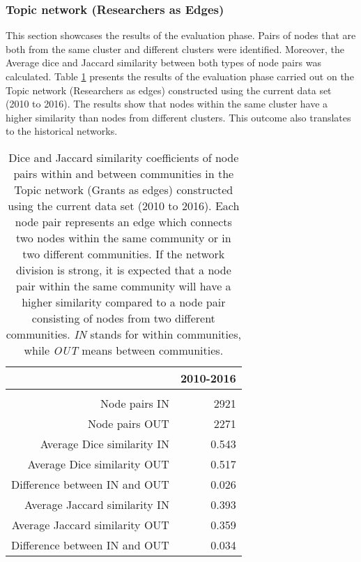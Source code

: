 {\subsubsection{Topic network (Researchers as Edges)}

This section showcases the results of the evaluation phase. Pairs of nodes that are both from the same cluster and different clusters were identified. Moreover, the Average dice and Jaccard similarity between both types of node pairs was calculated. Table \ref{table:topic_b_evaluation} presents the results of the evaluation phase carried out on the Topic network (Researchers as edges) constructed using the current data set (2010 to 2016). The results show that nodes within the same cluster have a higher similarity than nodes from different clusters. This outcome also translates to the historical networks.

\begin{table}[htpb]
\centering
\caption[Dice and Jaccard similarity coefficients of node pairs within and between communities in the Topic network (Researchers as edges) constructed using the current data set (2010 to 2016).]{Dice and Jaccard similarity coefficients of node pairs within and between communities in the Topic network (Grants as edges) constructed using the current data set (2010 to 2016). Each node pair represents an edge which connects two nodes within the same community or in two different communities. If the network division is strong, it is expected that a node pair within the same community will have a higher similarity compared to a node pair consisting of nodes from two different communities. \textit{IN} stands for within communities, while \textit{OUT} means between communities.}
\label{table:topic_b_evaluation}
\begin{tabular}{r|r}
{} & \textbf{2010-2016}\\
\hline\\
Node pairs IN                  & {2921}\\
Node pairs OUT                 & {2271}\\
Average Dice similarity IN     & {0.543}\\
Average Dice similarity OUT    & {0.517}\\
Difference between IN and OUT  & {0.026}\\
Average Jaccard similarity IN  & {0.393}\\
Average Jaccard similarity OUT & {0.359}\\
Difference between IN and OUT  & {0.034}\\
\end{tabular}
\end{table}

}
